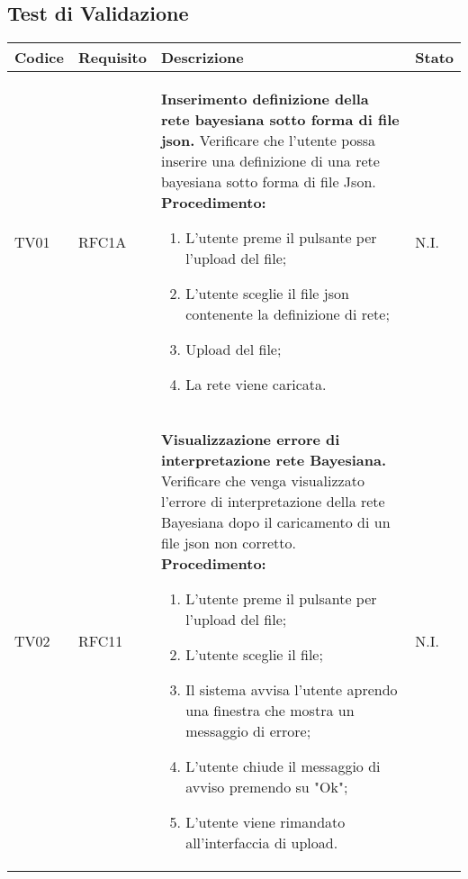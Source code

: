 \subsection{Test di Validazione}
\begin{table}[!htpb]
	\centering
	\renewcommand{\arraystretch}{2} 
	\begin{tabular}{|l|l|p{10cm}|l|}
		\rowcolor{orange!50}
		\hline
		\textbf{Codice} & \textbf{Requisito}& \textbf{Descrizione} & \textbf{Stato}\\ 
		\hline
		TV01 & RFC1A & 
			\textbf{Inserimento definizione della rete bayesiana sotto forma di file json.}
			\newline
			Verificare che l'utente possa inserire una definizione di una rete bayesiana sotto forma di file Json.
			\newline
			\textbf{Procedimento:}
			\begin{enumerate} 
				\item L’utente preme il pulsante per l’upload del file; 
				\item L’utente sceglie il file json contenente la definizione di rete; 
				\item Upload del file; 
				\item La rete viene caricata. 
			\end{enumerate}
			& N.I.\\
		\hline
		TV02 & RFC11 & 
			\textbf{Visualizzazione errore di interpretazione rete Bayesiana.} 
			\newline 
			Verificare che venga visualizzato l'errore di interpretazione della rete Bayesiana dopo il caricamento di un file json non corretto. 
			\newline 
			\textbf{Procedimento: } 
			\begin{enumerate} 
				\item L’utente preme il pulsante per l’upload del file; 
				\item L’utente sceglie il file; 
				\item Il sistema avvisa l'utente aprendo una finestra che mostra un messaggio di errore; 
				\item L'utente chiude il messaggio di avviso premendo su "Ok"; 
				\item L'utente viene rimandato all'interfaccia di upload. 
			\end{enumerate} 
			& N.I.\\
		\hline
	\end{tabular}
\end{table}
